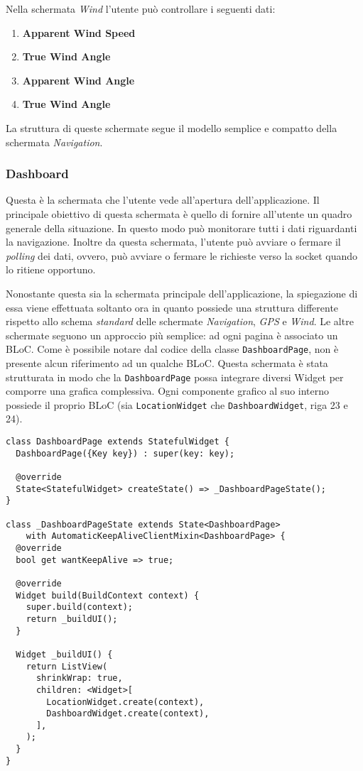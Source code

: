 Nella schermata \textit{Wind} l'utente può controllare i seguenti dati:
\begin{enumerate}
	\item \textbf{Apparent Wind Speed}
	\item \textbf{True Wind Angle}
	\item \textbf{Apparent Wind Angle}
	\item \textbf{True Wind Angle}
\end{enumerate}

La struttura di queste schermate segue il modello semplice e compatto della schermata \textit{Navigation}.

\subsubsection{Dashboard}
Questa è la schermata che l'utente vede all'apertura dell'applicazione. Il principale obiettivo di questa schermata è quello di fornire all'utente un quadro generale della situazione. In questo modo può monitorare tutti i dati riguardanti la navigazione. Inoltre da questa schermata, l'utente può avviare o fermare il \textit{polling} dei dati, ovvero, può avviare o fermare le richieste verso la socket quando lo ritiene opportuno.

Nonostante questa sia la schermata principale dell'applicazione, la spiegazione di essa viene effettuata soltanto ora in quanto possiede una struttura differente rispetto allo schema \textit{standard} delle schermate \textit{Navigation}, \textit{GPS} e \textit{Wind}. Le altre schermate seguono un approccio più semplice: ad ogni pagina è associato un BLoC. Come è possibile notare dal codice della classe \verb|DashboardPage|, non è presente alcun riferimento ad un qualche BLoC. Questa schermata è stata strutturata in modo che la \verb|DashboardPage| possa integrare diversi Widget per comporre una grafica complessiva. Ogni componente grafico al suo interno possiede il proprio BLoC (sia \verb|LocationWidget| che \verb|DashboardWidget|, riga 23 e 24).
\begin{lstlisting}
class DashboardPage extends StatefulWidget {
  DashboardPage({Key key}) : super(key: key);

  @override
  State<StatefulWidget> createState() => _DashboardPageState();
}

class _DashboardPageState extends State<DashboardPage>
    with AutomaticKeepAliveClientMixin<DashboardPage> {
  @override
  bool get wantKeepAlive => true;

  @override
  Widget build(BuildContext context) {
    super.build(context);
    return _buildUI();
  }

  Widget _buildUI() {
    return ListView(
      shrinkWrap: true,
      children: <Widget>[
        LocationWidget.create(context),
        DashboardWidget.create(context),
      ],
    );
  }
}
\end{lstlisting}

